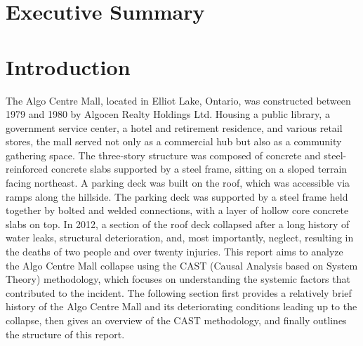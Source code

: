 \documentclass[12pt]{article}
\title{}
\date{June 2025}
\begin{document}
\maketitle


\newpage

\section*{Executive Summary}


\section{Introduction} 

The Algo Centre Mall, located in Elliot Lake, Ontario, was constructed between 1979 and 1980 by Algocen Realty Holdings Ltd. Housing a public library, a government service center, a hotel and retirement residence, and various retail stores, the mall served not only as a commercial hub but also as a community gathering space. The three-story structure was composed of concrete and steel-reinforced concrete slabs supported by a steel frame, sitting on a sloped terrain facing northeast. A parking deck was built on the roof, which was accessible via ramps along the hillside. The parking deck was supported by a steel frame held together by bolted and welded connections, with a layer of hollow core concrete slabs on top. In 2012, a section of the roof deck collapsed after a long history of water leaks, structural deterioration, and, most importantly, neglect, resulting in the deaths of two people and over twenty injuries. This report aims to analyze the Algo Centre Mall collapse using the CAST (Causal Analysis based on System Theory) methodology, which focuses on understanding the systemic factors that contributed to the incident. The following section first provides a relatively brief history of the Algo Centre Mall and its deteriorating conditions leading up to the collapse, then gives an overview of the CAST methodology, and finally outlines the structure of this  report.
\end{document}
